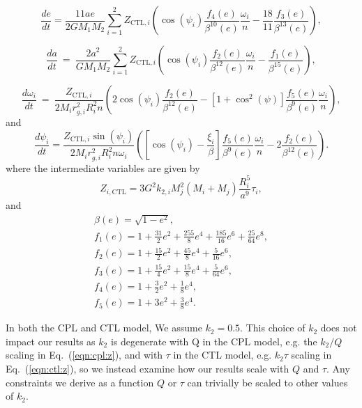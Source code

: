 \documentclass[twocolumn]{aastex61}
\begin{document}
\begin{equation} \label{eqn:ctl:e}
  \frac{de}{dt} = \frac{11 ae}{2 G M_1 M_2}
  \sum_{i = 1}^2 Z_{\mathrm{CTL},i} \left( \cos(\psi_i) \frac{f_4(e)}{\beta^{10}(e)}  \frac{\omega_i}{n} -\frac{18}{11} \frac{f_3(e)}{\beta^{13}(e)}\right),
\end{equation}

\small
\begin{equation}\label{eqn:ctl:a}
  \frac{da}{dt} \ = \  \frac{2 a^2}{G M_1 M_2}
  \sum\limits_{i = 1}^2 Z_{\mathrm{CTL},i} \left( \cos(\psi_i) \frac{f_2(e)}{\beta^{12}(e)} \frac{\omega_i}{n} - \frac{f_1(e)}{\beta^{15}(e)}\right),
\end{equation}

\begin{equation}\label{eqn:ctl:omega}
  \frac{d\omega_i}{dt} \ = \ \frac{Z_{\mathrm{CTL},i}}{2 M_i r_{g,i}^2 
R_i^2 n} \left( 2 \cos(\psi_i) \frac{f_2(e)}{\beta^{12}(e)} - \left[ 1+\cos^2(\psi)
 \right] \frac{f_5(e)}{\beta^9(e)} 
\frac{\omega_i}{n} \right),  
\end{equation}
and
\begin{equation}\label{eqn:ctl:psi}
  \frac{d\psi_i}{dt} = \frac{Z_{\mathrm{CTL},i} \sin(\psi_i)}{2 M_i r_{g,i}^2 R_i^2 n \omega_i}\left( \left[ \cos(\psi_i) - \frac{\xi_i}{ \beta} \right] \frac{f_5(e)}{\beta^9(e)} \frac{\omega_i}{n} - 2 \frac{f_2(e)}{\beta^{12}(e)} \right).
\end{equation}
\normalsize
where the intermediate variables are given by 
\begin{equation}\label{eqn:ctl:z}
 Z_{i,\mathrm{CTL}} = 3 G^2 k_{2,i} M_j^2 (M_i+M_j) \frac{R_i^5}{a^9} \tau_i ,
\end{equation}
and 
\begin{equation}\label{eqn:ctl:f_e}
\begin{array}{l}
\beta(e) = \sqrt{1-e^2},\\
f_1(e) = 1 + \frac{31}{2} e^2 + \frac{255}{8} e^4 + \frac{185}{16} e^6 + \frac{25}{
64} e^8,\\
f_2(e) = 1 + \frac{15}{2} e^2 + \frac{45}{8} e^4 + \frac{5}{16} e^6,\\
f_3(e) = 1 + \frac{15}{4} e^2 + \frac{15}{8} e^4 + \frac{5}{64} e^6,\\
f_4(e) = 1 + \frac{3}{2} e^2 + \frac{1}{8} e^4,\\
f_5(e) = 1 + 3 e^2 + \frac{3}{8} e^4.
\end{array}
\end{equation}

In both the CPL and CTL model, We assume $k_2 = 0.5$. This choice of $k_2$ does not impact our results as $k_2$ is degenerate with Q in the CPL model, e.g. the $k_2/Q$ scaling in Eq.~(\ref{eqn:cpl:z}), and with $\tau$ in the CTL model, e.g. $k_2 \tau$ scaling in Eq.~(\ref{eqn:ctl:z}), so we instead examine how our results scale with $Q$ and $\tau$.  Any constraints we derive as a function $Q$ or $\tau$ can trivially be scaled to other values of $k_2$.
\end{document}
